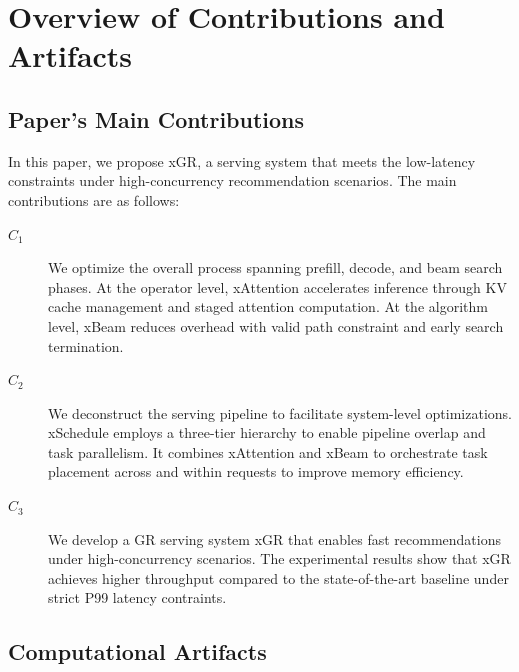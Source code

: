 \documentclass[conference]{IEEEtran}
\begin{document}


\appendixAD

\section{Overview of Contributions and Artifacts}

\subsection{Paper's Main Contributions}

In this paper, we propose xGR, a serving system that meets the low-latency constraints under high-concurrency recommendation scenarios. The main contributions are as follows:

\begin{description}
\item[$C_1$] We optimize the overall process spanning prefill, decode, and beam search phases. At the operator level, xAttention accelerates inference through KV cache management and staged attention computation. At the algorithm level, xBeam reduces overhead with valid path constraint and early search termination.
\item[$C_2$] We deconstruct the serving pipeline to facilitate system-level optimizations. xSchedule employs a three-tier hierarchy to enable pipeline overlap and task parallelism. It combines xAttention and xBeam to orchestrate task placement across and within requests to improve memory efficiency.
\item[$C_3$] We develop a GR serving system xGR that enables fast recommendations under high-concurrency scenarios. The experimental results show that xGR achieves higher throughput compared to the state-of-the-art baseline under strict P99 latency contraints.
\end{description}


\subsection{Computational Artifacts}

\end{document}
